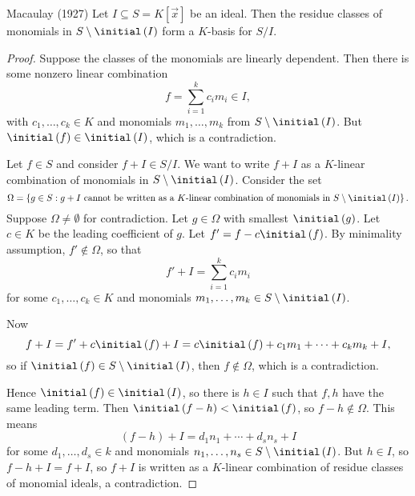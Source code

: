 \documentclass[co439]{subfiles}
\begin{document}
    \begin{theorem}{Macaulay (1927)}
        Let $I\subseteq S=K\left[ \vec{x} \right]$ be an ideal. Then the residue classes of monomials in $S\setminus\initial\left( I \right)$ form a $K$-basis for $S /I$.
    \end{theorem}

    \begin{proof}
        Suppose the classes of the monomials are linearly dependent. Then there is some nonzero linear combination
        \begin{equation*}
            f = \sum^{k}_{i=1} c_im_i \in I,
        \end{equation*}
        with $c_1,\ldots,c_k\in K$ and monomials $m_1,\ldots,m_k$ from $S\setminus\initial\left( I \right)$. But $\initial\left( f \right)\in\initial\left( I \right)$, which is a contradiction.

        Let $f\in S$ and consider $f+I \in S /I$. We want to write $f+I$ as a $K$-linear combination of monomials in $S\setminus\initial\left( I \right)$. Consider the set
        \begin{equation*}
            \Omega = \left\lbrace g\in S: \text{$g+I$ cannot be written as a $K$-linear combination of monomials in $S\setminus\initial\left( I \right)$} \right\rbrace.
        \end{equation*}
        Suppose $\Omega\neq\emptyset$ for contradiction. Let $g\in\Omega$ with smallest $\initial\left( g \right)$. Let $c\in K$ be the leading coefficient of $g$. Let $f' = f-c\initial\left( f \right)$. By minimality assumption, $f'\notin\Omega$, so that
        \begin{equation*}
            f'+I = \sum^{k}_{i=1}c_im_i
        \end{equation*}
        for some $c_1,\ldots,c_k\in K$ and monomials $m_1,\ldots,m_k\in S\setminus\initial\left( I \right)$.

        Now 
        \begin{equation*}
            f+I = f'+c\initial\left( f \right)+I = c\initial\left( f \right)+c_1m_1+\cdots+c_km_k+I,
        \end{equation*}
        so if $\initial\left( f \right)\in S\setminus \initial\left( I \right)$, then $f\notin\Omega$, which is a contradiction.

        Hence $\initial\left( f \right)\in\initial\left( I \right)$, so there is $h\in I$ such that $f,h$ have the same leading term. Then $\initial\left( f-h \right) < \initial\left( f \right)$, so $f-h\notin\Omega$. This means
        \begin{equation*}
            \left( f-h \right)+I = d_1n_1+\cdots+d_sn_s+I
        \end{equation*}
        for some $d_1,\ldots,d_s\in k$ and monomials $n_1,\ldots,n_s\in S\setminus\initial\left( I \right)$. But $h\in I$, so $f-h+I = f+I$, so $f+I$ is written as a $K$-linear combination of residue classes of monomial ideals, a contradiction.
    \end{proof}
    
\end{document}
